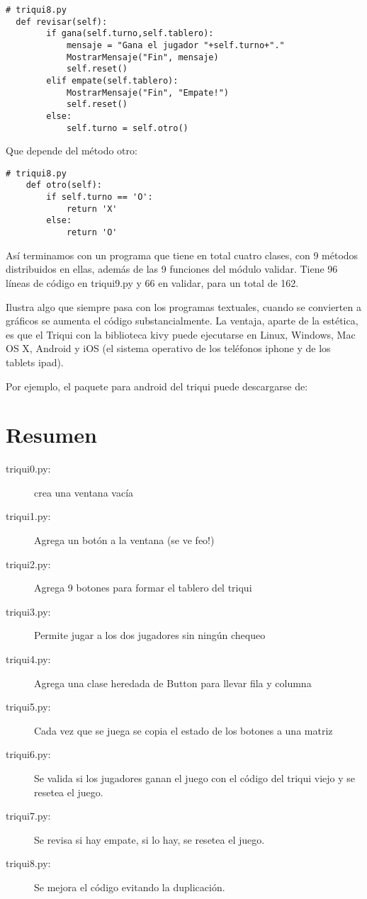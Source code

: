 \beforeverb
\begin{verbatim}
# triqui8.py
  def revisar(self):          
        if gana(self.turno,self.tablero):
            mensaje = "Gana el jugador "+self.turno+"."
            MostrarMensaje("Fin", mensaje)
            self.reset()
        elif empate(self.tablero):
            MostrarMensaje("Fin", "Empate!")
            self.reset()
        else:
            self.turno = self.otro()
\end{verbatim}
\afterverb

Que depende del método otro:


\beforeverb
\begin{verbatim}
# triqui8.py
    def otro(self):
        if self.turno == 'O':
            return 'X'
        else:
            return 'O'

\end{verbatim}
\afterverb

Así terminamos con un programa que tiene en total cuatro clases, con 9 métodos
distribuidos en ellas, además de las 9 funciones del módulo validar. Tiene 96
líneas de código en triqui9.py y 66 en validar, para un total de 162.

Ilustra algo que siempre pasa con los programas textuales, cuando se convierten 
a gráficos se aumenta el código substancialmente. La ventaja, aparte de la estética,
es que el Triqui con la biblioteca kivy puede ejecutarse en Linux, Windows, Mac OS X,
Android y iOS (el sistema operativo de los teléfonos iphone y de los tablets ipad).

Por ejemplo, el paquete para android del triqui puede descargarse de:



\section{Resumen}

\begin{description}

\item[triqui0.py:] crea una ventana vacía
\item[triqui1.py:] Agrega un botón a la ventana (se ve feo!)
\item[triqui2.py:] Agrega 9 botones para formar el tablero del triqui
\item[triqui3.py:] Permite jugar a los dos jugadores sin ningún chequeo
\item[triqui4.py:] Agrega una clase heredada de Button para llevar fila y columna 
\item[triqui5.py:] Cada vez que se juega se copia el estado de los botones a una matriz
\item[triqui6.py:] Se valida si los jugadores ganan el juego con el código del triqui viejo
	    y se resetea el juego.
\item[triqui7.py:] Se revisa si hay empate, si lo hay, se resetea el juego.
\item[triqui8.py:] Se mejora el código evitando la duplicación.
\end{description}


